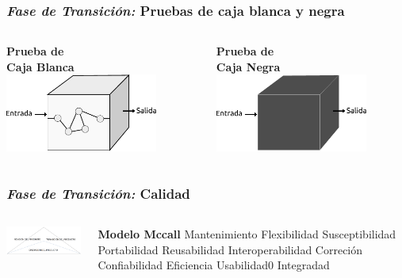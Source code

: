 \documentclass[xcolor=dvipsnames, xcolor=table]{beamer}
\begin{document}
\begin{frame}
    \frametitle{\textit{Fase de Transición:} Pruebas de caja blanca y negra}
    \begin{columns}
      \begin{column}{0.5\textwidth}
        \centering\textbf{\textcolor{color3}{\small Prueba de\\Caja Blanca}\vspace{5mm}}
        \centering\includegraphics[width=5cm]{CBlanca}
      \end{column}
      \begin{column}{0.5\textwidth}
        \centering\textbf{\textcolor{color3}{\small Prueba de\\Caja Negra}\vspace{5mm}}
        \centering\includegraphics[width=5cm]{CNegra}
      \end{column}
    \end{columns}
\end{frame}

\begin{frame}
    \frametitle{\textit{Fase de Transición:} Calidad}
    \begin{columns}
      \begin{column}{0.7\textwidth}

        \centering\includegraphics[width=6.5cm]{mccall}
      \end{column}
      \begin{column}{0.3\textwidth}
        \textbf{\textcolor{color3}{\small Modelo Mccall}\vspace{2mm}}
        \small\quad Mantenimiento
        \quad Flexibilidad
        \vspace{2mm}
        Susceptibilidad
        \quad Portabilidad
        \quad Reusabilidad
        \vspace{2mm}
        Interoperabilidad
        \quad Correción
        \quad Confiabilidad
        \quad Eficiencia
        \quad Usabilidad0
        \quad Integradad
      \end{column}
    \end{columns}
\end{frame}
\end{document}

